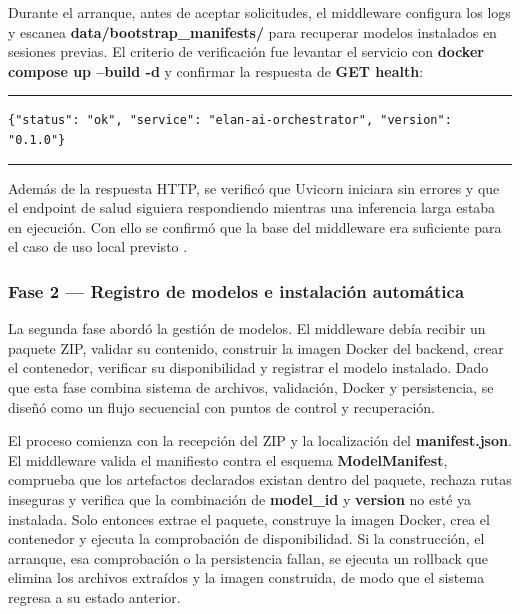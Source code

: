 \documentclass[11pt,a4paper]{article}
\begin{document}
Durante el arranque, antes de aceptar solicitudes, el middleware configura los logs y escanea \textbf{data/bootstrap\_manifests/} para recuperar modelos instalados en sesiones previas. El criterio de verificación fue levantar el servicio con \textbf{docker compose up --build -d} y confirmar la respuesta de \textbf{GET health}:

\begin{center}
\begin{minipage}{0.95\textwidth}
\hrule
\vspace{0.12cm}
\small
\begin{Verbatim}[baselinestretch=0.82]
{"status": "ok", "service": "elan-ai-orchestrator", "version": "0.1.0"}
\end{Verbatim}
\vspace{0.05cm}
\hrule

\label{lst:health_response}
\end{minipage}
\end{center}

Además de la respuesta HTTP, se verificó que Uvicorn iniciara sin errores y que el endpoint de salud siguiera respondiendo mientras una inferencia larga estaba en ejecución. Con ello se confirmó que la base del middleware era suficiente para el caso de uso local previsto \cite{uvicorn_docs}.

\subsubsection{Fase 2 — Registro de modelos e instalación automática}

La segunda fase abordó la gestión de modelos. El middleware debía recibir un paquete ZIP, validar su contenido, construir la imagen Docker del backend, crear el contenedor, verificar su disponibilidad y registrar el modelo instalado. Dado que esta fase combina sistema de archivos, validación, Docker y persistencia, se diseñó como un flujo secuencial con puntos de control y recuperación.

El proceso comienza con la recepción del ZIP y la localización del \textbf{manifest.json}. El middleware valida el manifiesto contra el esquema \textbf{ModelManifest}, comprueba que los artefactos declarados existan dentro del paquete, rechaza rutas inseguras y verifica que la combinación de \textbf{model\_id} y \textbf{version} no esté ya instalada. Solo entonces extrae el paquete, construye la imagen Docker, crea el contenedor y ejecuta la comprobación de disponibilidad. Si la construcción, el arranque, esa comprobación o la persistencia fallan, se ejecuta un rollback que elimina los archivos extraídos y la imagen construida, de modo que el sistema regresa a su estado anterior.
\end{document}
